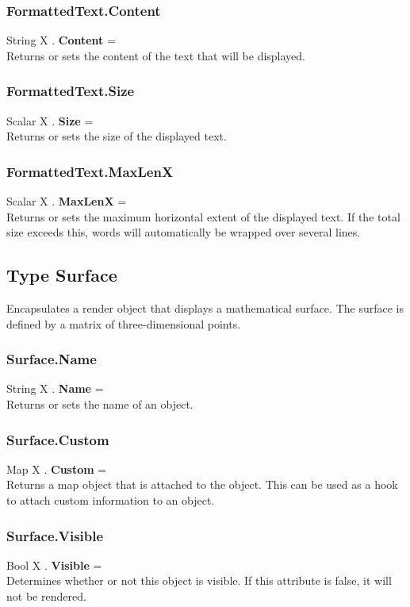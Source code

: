 \subsubsection{FormattedText.Content \label{F:FormattedText:Content}}
String X . \textbf{Content} = \\
Returns or sets the content of the text that will be displayed.

\subsubsection{FormattedText.Size \label{F:FormattedText:Size}}
Scalar X . \textbf{Size} = \\
Returns or sets the size of the displayed text.

\subsubsection{FormattedText.MaxLenX \label{F:FormattedText:MaxLenX}}
Scalar X . \textbf{MaxLenX} = \\
Returns or sets the maximum horizontal extent of the displayed text. If the total size exceeds this, words will automatically be wrapped over several lines.

\subsection{Type Surface \label{T:Surface}}
Encapsulates a render object that displays a mathematical surface. The surface is defined by a matrix of three-dimensional points.

\subsubsection{Surface.Name \label{F:Surface:Name}}
String X . \textbf{Name} = \\
Returns or sets the name of an object.

\subsubsection{Surface.Custom \label{F:Surface:Custom}}
Map X . \textbf{Custom} = \\
Returns a map object that is attached to the object. This can be used as a hook to attach custom information to an object.


\subsubsection{Surface.Visible \label{F:Surface:Visible}}
Bool X . \textbf{Visible} = \\
Determines whether or not this object is visible. If this attribute is false, it will not be rendered.

